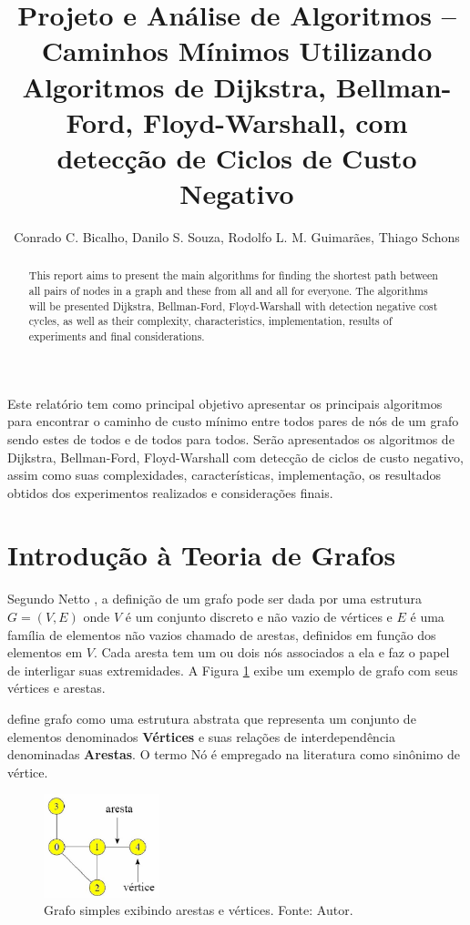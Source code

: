 \documentclass[12pt]{article}
\title{Projeto e Análise de Algoritmos -- \\ Caminhos Mínimos Utilizando Algoritmos de Dijkstra, Bellman-Ford, Floyd-Warshall, com detecção de Ciclos de Custo Negativo}
\author{Conrado C. Bicalho, Danilo S. Souza, Rodolfo L. M. Guimarães, Thiago Schons}
\begin{document}
 

\maketitle

\begin{abstract}
This report aims to present the main algorithms for finding the shortest path between all pairs of nodes in a graph and these from all and all for everyone. The algorithms will be presented Dijkstra, Bellman-Ford, Floyd-Warshall with detection negative cost cycles, as well as their complexity, characteristics, implementation, results of experiments and final considerations.
\end{abstract}
     
\begin{resumo} 
Este relatório tem como principal objetivo apresentar os principais algoritmos para encontrar o caminho de custo mínimo entre todos pares de nós de um grafo sendo estes de todos e de todos para todos. Serão apresentados os algoritmos de Dijkstra, Bellman-Ford, Floyd-Warshall com detecção de ciclos de custo negativo, assim como suas complexidades, características, implementação, os resultados obtidos dos experimentos realizados e considerações finais.
\end{resumo}



\section{Introdução à Teoria de Grafos}

Segundo Netto \cite{netto2003grafos}, a definição de um grafo pode ser dada por uma estrutura $G=(V,E)$ onde $V$ é um conjunto discreto e não vazio de vértices e $E$ é uma família de elementos não vazios chamado de arestas, definidos em função dos elementos em $V$. Cada aresta tem um ou dois nós associados a ela e faz o papel de interligar suas extremidades. A Figura \ref{fig:naoponderado} exibe um exemplo de grafo com seus vértices e arestas.

\cite{goldbarg2012grafos} define grafo como uma estrutura abstrata que representa um conjunto de elementos denominados \textbf{Vértices} e suas relações de interdependência denominadas \textbf{Arestas}. O termo Nó é empregado na literatura como sinônimo de vértice.

\begin{figure}[H]
  \centering
    \includegraphics[width=0.3\textwidth]{img/naoponderado.jpg}
  \caption{Grafo simples exibindo arestas e vértices. Fonte: Autor.}
  \label{fig:naoponderado}
\end{figure}
\end{document}
